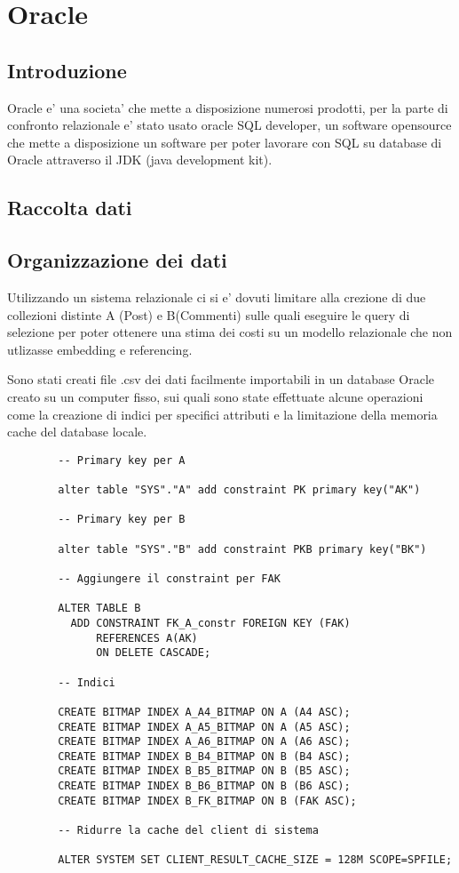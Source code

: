 \chapter{Oracle}

\section{Introduzione}

Oracle e' una societa' che mette a disposizione numerosi prodotti, per la parte di confronto relazionale e' stato usato oracle SQL developer, un software opensource che 
mette a disposizione un software per poter lavorare con SQL su database di Oracle attraverso il JDK (java development kit).

\section{Raccolta dati}

\section{Organizzazione dei dati}

Utilizzando un sistema relazionale ci si e' dovuti limitare alla crezione di due collezioni distinte A (Post) e B(Commenti) sulle quali eseguire le query di selezione per poter
ottenere una stima dei costi su un modello relazionale che non utlizasse embedding e referencing.

Sono stati creati file .csv dei dati facilmente importabili in un database Oracle creato su un computer fisso, sui quali sono state effettuate alcune operazioni come la creazione di 
indici per specifici attributi e la limitazione della memoria cache del database locale. 

\begin{verbatim}
        -- Primary key per A

        alter table "SYS"."A" add constraint PK primary key("AK") 

        -- Primary key per B

        alter table "SYS"."B" add constraint PKB primary key("BK") 

        -- Aggiungere il constraint per FAK

        ALTER TABLE B
          ADD CONSTRAINT FK_A_constr FOREIGN KEY (FAK)     
              REFERENCES A(AK)
              ON DELETE CASCADE;

        -- Indici

        CREATE BITMAP INDEX A_A4_BITMAP ON A (A4 ASC);
        CREATE BITMAP INDEX A_A5_BITMAP ON A (A5 ASC);
        CREATE BITMAP INDEX A_A6_BITMAP ON A (A6 ASC);
        CREATE BITMAP INDEX B_B4_BITMAP ON B (B4 ASC);
        CREATE BITMAP INDEX B_B5_BITMAP ON B (B5 ASC);
        CREATE BITMAP INDEX B_B6_BITMAP ON B (B6 ASC);
        CREATE BITMAP INDEX B_FK_BITMAP ON B (FAK ASC);

        -- Ridurre la cache del client di sistema

        ALTER SYSTEM SET CLIENT_RESULT_CACHE_SIZE = 128M SCOPE=SPFILE;
 
\end{verbatim}


